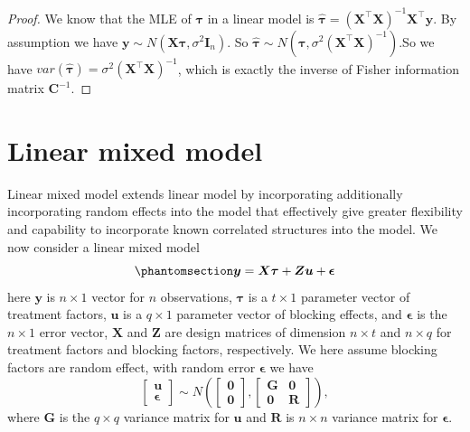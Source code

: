 \documentclass[
  a4paper,
  oneside,
  openany,
  12pt,
  onecolumn]{book}
\theoremstyle{plain}
\theoremstyle{definition}
\theoremstyle{remark}
\begin{document}
\begin{proof}
We know that the MLE of \(\boldsymbol{\tau}\) in a linear model is
\(\hat{\boldsymbol{\tau}}=(\boldsymbol{X}^\top\boldsymbol{X})^{-1}\boldsymbol{X}^\top\boldsymbol{y}\).
By assumption we have
\(\boldsymbol{y} \sim N(\mathbf{X}\boldsymbol{\tau}, \sigma^2\mathbf{I}_n)\).
So
\(\hat{\boldsymbol{\tau}}\sim N(\boldsymbol{\tau},\sigma^2(\boldsymbol{X}^\top\boldsymbol{X})^{-1})\).So
we have
\(var(\hat{\boldsymbol{\tau}}) = \sigma^2(\boldsymbol{X}^\top\boldsymbol{X})^{-1}\),
which is exactly the inverse of Fisher information matrix
\(\mathbf{C}^{-1}\).
\end{proof}

\section{Linear mixed model}\label{linear-mixed-model}

Linear mixed model extends linear model by incorporating additionally
incorporating random effects into the model that effectively give
greater flexibility and capability to incorporate known correlated
structures into the model. We now consider a linear mixed model
\begin{equation}\phantomsection\label{eq-lmm}{
\boldsymbol{y}=\boldsymbol{X}\boldsymbol{\tau}+\boldsymbol{Z}\boldsymbol{u}+\boldsymbol{\epsilon}
}\end{equation} here \(\boldsymbol{y}\) is \(n\times 1\) vector for
\(n\) observations, \(\boldsymbol{\tau}\) is a \(t\times1\) parameter
vector of treatment factors, \(\boldsymbol{u}\) is a \(q \times1\)
parameter vector of blocking effects, and \(\boldsymbol{\epsilon}\) is
the \(n\times 1\) error vector, \(\boldsymbol{X}\) and
\(\boldsymbol{Z}\) are design matrices of dimension \(n \times t\) and
\(n \times q\) for treatment factors and blocking factors, respectively.
We here assume blocking factors are random effect, with random error
\(\boldsymbol{\epsilon}\) we have \[
\begin{bmatrix}
\boldsymbol{u} \\
\boldsymbol{\epsilon} 
\end{bmatrix}
\sim
N\left(
\begin{bmatrix}
\boldsymbol{0} \\
\boldsymbol{0}
\end{bmatrix}
,
\begin{bmatrix}
\boldsymbol{G} & \mathbf{0} \\
\mathbf{0} & \boldsymbol{R}
\end{bmatrix}
\right),
\] where \(\boldsymbol{G}\) is the \(q \times q\) variance matrix for
\(\boldsymbol{u}\) and \(\boldsymbol{R}\) is \(n\times n\) variance
matrix for \(\boldsymbol{\epsilon}\).
\end{document}
